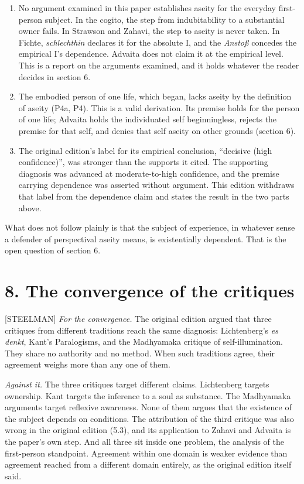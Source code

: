 \documentclass[11pt]{article}
\newcommand{\register}[1]{{\ttfamily\small #1}}
\begin{document}
\begin{enumerate}
\item No argument examined in this paper establishes aseity for the everyday first-person subject. In the cogito, the step from indubitability to a substantial owner fails. In Strawson and Zahavi, the step to aseity is never taken. In Fichte, \emph{schlechthin} declares it for the absolute I, and the \emph{Anstoß} concedes the empirical I's dependence. Advaita does not claim it at the empirical level. This is a report on the arguments examined, and it holds whatever the reader decides in section 6.
\item The embodied person of one life, which began, lacks aseity by the definition of aseity (P4a, P4). This is a valid derivation. Its premise holds for the person of one life; Advaita holds the individuated self beginningless, rejects the premise for that self, and denies that self aseity on other grounds (section 6).
\item The original edition's label for its empirical conclusion, ``decisive (high confidence)'', was stronger than the supports it cited. The supporting diagnosis was advanced at moderate-to-high confidence, and the premise carrying dependence was asserted without argument. This edition withdraws that label from the dependence claim and states the result in the two parts above.
\end{enumerate}
What does not follow plainly is that the subject of experience, in whatever sense a defender of perspectival aseity means, is existentially dependent. That is the open question of section 6.

\section*{8. The convergence of the critiques}

\register{[STEELMAN]} \emph{For the convergence.} The original edition argued that three critiques from different traditions reach the same diagnosis: Lichtenberg's \emph{es denkt}, Kant's Paralogisms, and the Madhyamaka critique of self-illumination. They share no authority and no method. When such traditions agree, their agreement weighs more than any one of them.

\emph{Against it.} The three critiques target different claims. Lichtenberg targets ownership. Kant targets the inference to a soul as substance. The Madhyamaka arguments target reflexive awareness. None of them argues that the existence of the subject depends on conditions. The attribution of the third critique was also wrong in the original edition (5.3), and its application to Zahavi and Advaita is the paper's own step. And all three sit inside one problem, the analysis of the first-person standpoint. Agreement within one domain is weaker evidence than agreement reached from a different domain entirely, as the original edition itself said.
\end{document}
